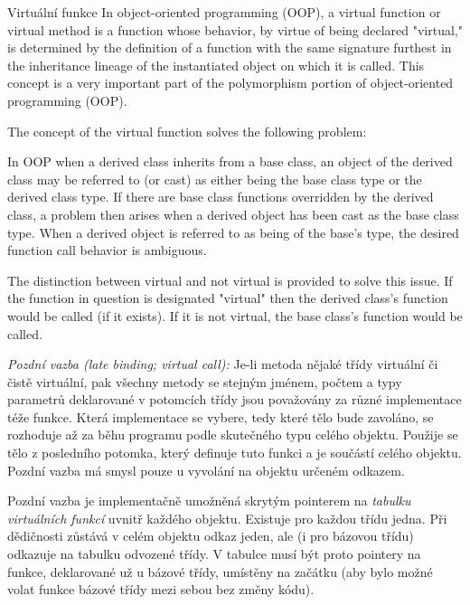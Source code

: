 \begin{obecne}{Virtuální funkce}
In object-oriented programming (OOP), a virtual function or virtual method is a function whose behavior, by virtue of being declared "virtual," is determined by the definition of a function with the same signature furthest in the inheritance lineage of the instantiated object on which it is called. This concept is a very important part of the polymorphism portion of object-oriented programming (OOP).

The concept of the virtual function solves the following problem:

In OOP when a derived class inherits from a base class, an object of the derived class may be referred to (or cast) as either being the base class type or the derived class type. If there are base class functions overridden by the derived class, a problem then arises when a derived object has been cast as the base class type. When a derived object is referred to as being of the base's type, the desired function call behavior is ambiguous.

The distinction between virtual and not virtual is provided to solve this issue. If the function in question is designated "virtual" then the derived class's function would be called (if it exists). If it is not virtual, the base class's function would be called.

\emph{Pozdní vazba (late binding; virtual call):} Je-li metoda nějaké třídy virtuální či čistě virtuální, pak všechny metody se stejným jménem, počtem a typy parametrů deklarované v potomcích třídy jsou považovány za různé implementace téže funkce. Která implementace se vybere, tedy které tělo bude zavoláno, se rozhoduje až za běhu programu podle skutečného typu celého objektu. Použije se tělo z posledního potomka, který definuje tuto funkci a je součástí celého objektu. Pozdní vazba má smysl pouze u vyvolání na objektu určeném odkazem.

Pozdní vazba je implementačně umožněná skrytým pointerem na \emph{tabulku virtuálních funkcí} uvnitř každého objektu. Existuje pro každou třídu jedna. Při dědičnosti zůstává v celém objektu odkaz jeden, ale (i pro  bázovou třídu) odkazuje na tabulku odvozené třídy. V tabulce musí být proto pointery na funkce, deklarované už u bázové třídy, umístěny na začátku (aby bylo možné volat funkce bázové třídy mezi sebou bez změny kódu).
\end{obecne}

